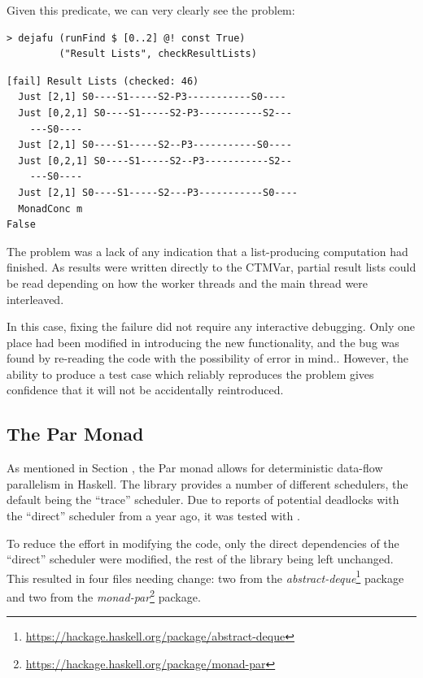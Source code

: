Given this predicate, we can very clearly see the problem:

\begin{verbatim}
> dejafu (runFind $ [0..2] @! const True)
         ("Result Lists", checkResultLists)
\end{verbatim}
\begin{verbatim}
[fail] Result Lists (checked: 46)
  Just [2,1] S0----S1-----S2-P3-----------S0----
  Just [0,2,1] S0----S1-----S2-P3-----------S2---
    ---S0----
  Just [2,1] S0----S1-----S2--P3-----------S0----
  Just [0,2,1] S0----S1-----S2--P3-----------S2--
    ---S0----
  Just [2,1] S0----S1-----S2---P3-----------S0----
  MonadConc m
False
\end{verbatim}

The problem was a lack of any indication that a list-producing
computation had finished. As results were written directly to the
CTMVar, partial result lists could be read depending on how the worker
threads and the main thread were interleaved.

In this case, fixing the failure did not require any interactive
debugging. Only one place had been modified in introducing the new
functionality, and the bug was found by re-reading the code with the
possibility of error in mind.. However, the ability to produce a test
case which reliably reproduces the problem gives confidence that it
will not be accidentally reintroduced.

\subsection*{The Par Monad}
\label{sec:dejafu-example-parmonad}

As mentioned in Section , the Par monad allows for
deterministic data-flow parallelism in Haskell. The library provides a
number of different schedulers, the default being the ``trace''
scheduler. Due to reports of potential deadlocks with the ``direct''
scheduler from a year ago\cite{parreddit}, it was tested with
\dejafu{}.

To reduce the effort in modifying the code, only the direct
dependencies of the ``direct'' scheduler were modified, the rest of
the library being left unchanged. This resulted in four files needing
change: two from the
\textit{abstract-deque}\footnote{\url{https://hackage.haskell.org/package/abstract-deque}}
package and two from the
\textit{monad-par}\footnote{\url{https://hackage.haskell.org/package/monad-par}}
package.

